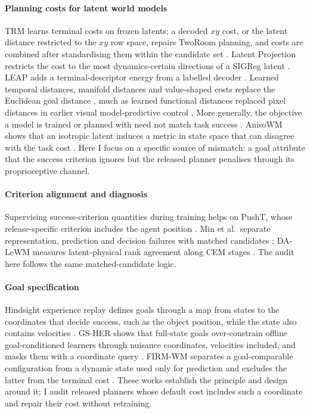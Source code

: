 \paragraph{Planning costs for latent world models} TRM learns terminal costs on frozen latents; a decoded $xy$ cost, or
the latent distance restricted to the $xy$ row space, repairs TwoRoom planning, and costs are combined after
standardising them within the candidate set \cite{li2026trm}. Latent Projection restricts the cost to the most
dynamics-certain directions of a SIGReg latent \cite{jang2026projection}. LEAP adds a terminal-descriptor energy from a
labelled decoder \cite{pham2026leap}. Learned temporal distances, manifold distances and value-shaped costs replace the
Euclidean goal distance \cite{moukheiber2026tempo,you2026ngc,destrade2026value}, much as learned functional distances
replaced pixel distances in earlier visual model-predictive control \cite{ebert2018foresight,tian2020functional}. More
generally, the objective a model is trained or planned with need not match task success \cite{lambert2020mismatch}. AnisoWM shows that an isotropic latent
induces a metric in state space that can disagree with the task cost \cite{kang2026aniso}. Here I focus on a specific source of mismatch: a goal attribute that the success criterion ignores but the
released planner penalises through its proprioceptive channel.

\paragraph{Criterion alignment and diagnosis} Supervising success-criterion quantities during training helps on PushT,
whose release-specific criterion includes the agent position \cite{hara2026criterion}. Min et al.\ separate
representation, prediction and decision failures with matched candidates \cite{min2026misleads}; DA-LeWM measures
latent-physical rank agreement along CEM stages \cite{wang2026dalewm}. The audit here follows the same matched-candidate
logic.

\paragraph{Goal specification} Hindsight experience replay defines goals through a map from states to the coordinates
that decide success, such as the object position, while the state also contains velocities \cite{andrychowicz2017her}.
GS-HER shows that full-state goals over-constrain offline goal-conditioned learners through nuisance coordinates,
velocities included, and masks them with a coordinate query \cite{velez2026gsher}. FIRM-WM separates a goal-comparable
configuration from a dynamic state used only for prediction and excludes the latter from the terminal cost
\cite{wu2026firm}. These works establish the principle and design around it; I audit released planners whose default
cost includes such a coordinate and repair their cost without retraining.


